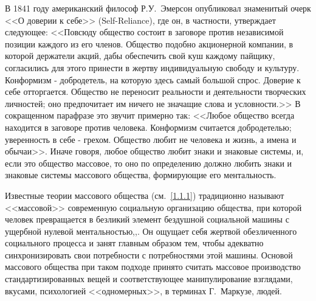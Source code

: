 В 1841 году американский философ Р.У.~Эмерсон опубликовал знаменитый очерк <<О доверии к себе>> (Self-Reliance),
где он, в частности, утверждает следующее: <<Повсюду общество состоит в заговоре против независимой позиции каждого из его членов. Общество подобно акционерной компании, в которой держатели акций, дабы  обеспечить свой куш каждому пайщику, согласились для этого принести в жертву  индивидуальную свободу и культуру. Конформизм  - добродетель, на которую здесь самый большой спрос.  Доверие к себе отторгается. Общество не переносит реальности и деятельности творческих личностей; оно предпочитает им ничего не значащие слова и условности.>>\autocite{emerson1972self} В сокращенном парафразе это звучит примерно
так: <<Любое общество всегда находится в заговоре против человека. Конформизм считается добродетелью;
уверенность в себе - грехом. Общество любит не человека и жизнь, а имена и обычаи>>. Иначе говоря,
любое общество любит знаки и знаковые системы, и, если это общество массовое, то оно по определению
должно любить знаки и знаковые системы массового общества, формирующие его ментальность. 

Известные теории массового общества (см.~\ref{1.1.1}) традиционно называют <<массовой>>
современную социальную организацию общества, при которой человек превращается в безликий
элемент бездушной социальной машины с ущербной нулевой ментальностью\autocite{macdonald2011},\autocite[][3-30]{leavis1930},\autocite[][79-202]{eliot2010}. Он ощущает себя жертвой обезличенного социального процесса и занят главным образом тем, чтобы адекватно синхронизировать свои потребности с потребностями этой машины. Основой массового общества при таком подходе принято считать массовое производство стандартизированных вещей и соответствующее манипулирование взглядами, вкусами, психологией <<одномерных>>, в терминах Г.~Маркузе, людей.

